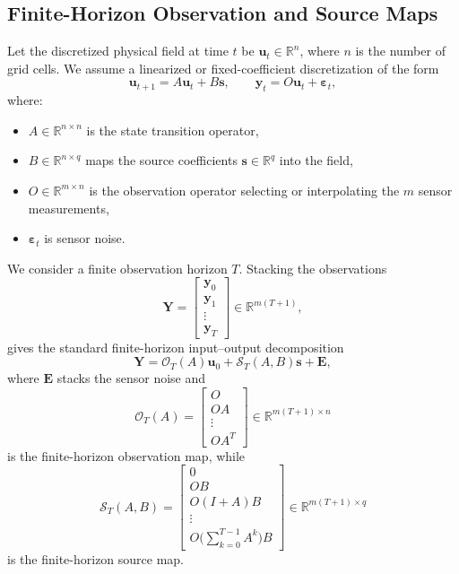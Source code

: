 \subsection{Finite-Horizon Observation and Source Maps}

Let the discretized physical field at time $t$ be $\mathbf{u}_t \in \mathbb{R}^n$, where $n$ is the number of grid cells. We assume a linearized or fixed-coefficient discretization of the form
\begin{equation}
\mathbf{u}_{t+1} = A \mathbf{u}_t + B \mathbf{s},
\qquad
\mathbf{y}_t = O \mathbf{u}_t + \boldsymbol{\varepsilon}_t,
\label{eq:lds_setup}
\end{equation}
where:
\begin{itemize}
    \item $A \in \mathbb{R}^{n \times n}$ is the state transition operator,
    \item $B \in \mathbb{R}^{n \times q}$ maps the source coefficients $\mathbf{s}\in \mathbb{R}^q$ into the field,
    \item $O \in \mathbb{R}^{m \times n}$ is the observation operator selecting or interpolating the $m$ sensor measurements,
    \item $\boldsymbol{\varepsilon}_t$ is sensor noise.
\end{itemize}

We consider a finite observation horizon $T$. Stacking the observations
\begin{equation}
\mathbf{Y}
=
\begin{bmatrix}
\mathbf{y}_0\\
\mathbf{y}_1\\
\vdots\\
\mathbf{y}_T
\end{bmatrix}
\in \mathbb{R}^{m(T+1)},
\end{equation}
gives the standard finite-horizon input--output decomposition
\begin{equation}
\mathbf{Y}
=
\mathcal{O}_T(A)\mathbf{u}_0 + \mathcal{S}_T(A,B)\mathbf{s} + \mathbf{E},
\label{eq:stacked_map}
\end{equation}
where $\mathbf{E}$ stacks the sensor noise and
\begin{equation}
\mathcal{O}_T(A)
=
\begin{bmatrix}
O\\
OA\\
\vdots\\
OA^T
\end{bmatrix}
\in \mathbb{R}^{m(T+1)\times n}
\label{eq:obs_map}
\end{equation}
is the finite-horizon observation map, while
\begin{equation}
\mathcal{S}_T(A,B)
=
\begin{bmatrix}
0\\
OB\\
O(I+A)B\\
\vdots\\
O\big(\sum_{k=0}^{T-1}A^k\big)B
\end{bmatrix}
\in \mathbb{R}^{m(T+1)\times q}
\label{eq:source_map}
\end{equation}
is the finite-horizon source map.

